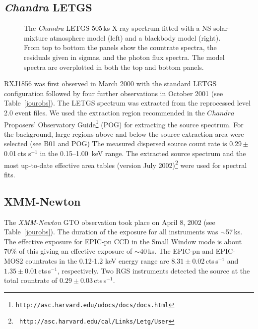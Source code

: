 \documentclass[twocolumn]{aa}
\newcommand{\modi}[1]{{#1}}
\begin{document}
\subsection{{\it Chandra} LETGS}		

%
%
\begin{figure}
   \centerline{ 
	       }
   \caption{\modi{The {\it Chandra}  LETGS 505\,ks X-ray spectrum fitted 
   with a NS solar-mixture atmosphere model (left) and a blackbody model (right). 
   From top to bottom the panels show the countrate spectra, the residuals given in sigmas,
    and the photon flux spectra. The model spectra are overplotted in both the top and
    bottom panels.}
   \label{atmobbmod} }
\end{figure}
RXJ1856 was first observed in March 2000 with the standard 
LETGS configuration followed by four further observations 
in October 2001 (see Table~\ref{jourobs}).
The LETGS spectrum was extracted from the 
reprocessed level 2.0 event files. 
We used the extraction region recommended in the $Chandra$ 
Proposers' Observatory Guide\footnote{
{\tt http://asc.harvard.edu/udocs/docs/docs.html}} (POG)
for extracting the source spectrum.
For the background, large regions above and below the
source extraction area were selected (see B01 and POG)
The measured dispersed source count rate is 
0.29\,$\pm$\,0.01\,cts s$^{-1}$
in the 0.15--1.00~keV range.
The extracted source spectrum and the most up-to-date 
effective area tables (version July 2002)\footnote{{\tt 
http://asc.harvard.edu/cal/Links/Letg/User}} were used 
for spectral fits.

\subsection{XMM-Newton}

The  {\sl XMM-Newton} GTO observation took place on April 8, 2002
(see Table~\ref{jourobs}).
The duration of the exposure for all instruments was $\sim$57\,ks. 
The effective exposure for EPIC-pn CCD in the Small Window mode is 
about 70\% of this giving an effective exposure of $\sim 40$\,ks. 
The EPIC-pn and EPIC-MOS2 countrates in the 0.12-1.2 keV energy range
are $8.31\pm0.02$\,cts\,s$^{-1}$ and $1.35\pm0.01$\,cts\,s$^{-1}$, 
respectively.
Two RGS instruments detected the source at the total countrate of 
$0.29\pm0.03$\,cts\,s$^{-1}$.
\end{document}
